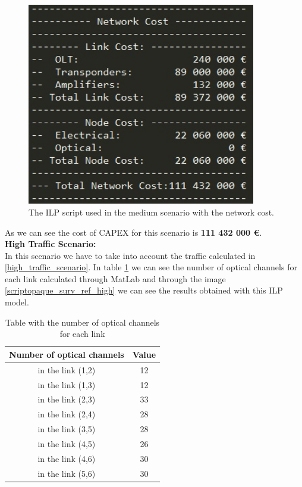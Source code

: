 \begin{figure}[h!]
\centering
\includegraphics[width=10cm]{sdf/ilp/figures/script_opaque_protec_ref_medium}
\caption{The ILP script used in the medium scenario with the network cost.}
\label{scriptopaque_surv_ref_medium}
\end{figure}

As we can see the cost of CAPEX for this scenario is \textbf{111 432 000 \euro}.\\


\textbf{High Traffic Scenario:}\\

In this scenario we have to take into account the traffic calculated in \ref{high_traffic_scenario}. In table \ref{result_ILP3P_reference} we can see the number of optical channels for each link calculated through MatLab and through the image \ref{scriptopaque_surv_ref_high} we can see the results obtained with this ILP model.\\

\begin{table}[h!]
\centering
\begin{tabular}{|| c | c||}
 \hline
 Number of optical channels & Value \\
 \hline\hline
 in the link (1,2) & 12 \\
 in the link (1,3) & 12 \\
 in the link (2,3) & 33 \\
 in the link (2,4) & 28 \\
 in the link (3,5) & 28 \\
 in the link (4,5) & 26 \\
 in the link (4,6) & 30 \\
 in the link (5,6) & 30 \\
 \hline
\end{tabular}
\caption{Table with the number of optical channels for each link}
\label{result_ILP3P_reference}
\end{table}
\newpage

